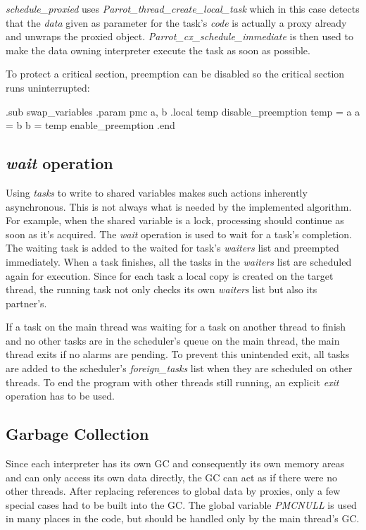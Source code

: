 \documentclass[bachelor,english]{hgbthesis}
\begin{document}
\textit{schedule\_proxied} uses \textit{Parrot\_thread\_create\_local\_task} which in this case detects that the \textit{data} given as parameter for the task's \textit{code} is actually a proxy already and unwraps the proxied object. \textit{Parrot\_cx\_schedule\_immediate} is then used to make the data owning interpreter execute the task as soon as possible.

To protect a critical section, preemption can be disabled so the critical section runs uninterrupted:
%
\begin{GenericCode}
.sub swap_variables
    .param pmc a, b
    .local temp
    disable_preemption
    temp = a
    a = b
    b = temp
    enable_preemption
.end
\end{GenericCode}

\subsection{\textit{wait} operation}

Using \textit{tasks} to write to shared variables makes such actions inherently asynchronous. This is not always what is needed by the implemented algorithm. For example, when the shared variable is a lock, processing should continue as soon as it's acquired. The \textit{wait} operation is used to wait for a task's completion. The waiting task is added to the waited for task's \textit{waiters} list and preempted immediately. When a task finishes, all the tasks in the \textit{waiters} list are scheduled again for execution. Since for each task a local copy is created on the target thread, the running task not only checks its own \textit{waiters} list but also its partner's.

If a task on the main thread was waiting for a task on another thread to finish and no other tasks are in the scheduler's queue on the main thread, the main thread exits if no alarms are pending. To prevent this unintended exit, all tasks are added to the scheduler's \textit{foreign\_tasks} list when they are scheduled on other threads. To end the program with other threads still running, an explicit \textit{exit} operation has to be used.

\subsection{Garbage Collection}

Since each interpreter has its own GC and consequently its own memory areas and can only access its own data directly, the GC can act as if there were no other threads. After replacing references to global data by proxies, only a few special cases had to be built into the GC. The global variable \textit{PMCNULL} is used in many places in the code, but should be handled only by the main thread's GC.
\end{document}
